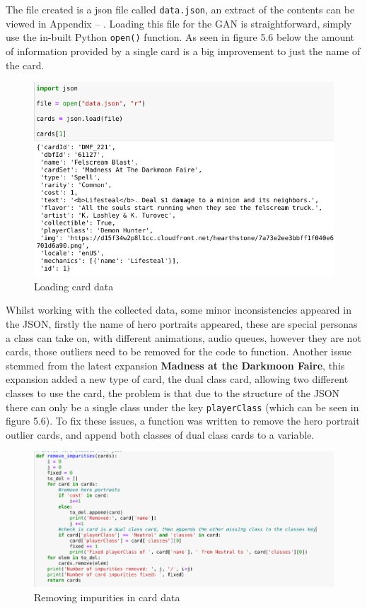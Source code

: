 \documentclass{report} %
\begin{document}
The file created is a json file called \nolinkurl{data.json}, an extract of the contents can be viewed in Appendix -- .  Loading this file for the GAN is straightforward, simply use the in-built Python \nolinkurl{open()} function. As seen in figure 5.6 below the amount of information provided by a single card is a big improvement to just the name of the card.

\begin{figure}[H]
\centering
\includegraphics[width=1\textwidth]{jsonOpen}
\caption{Loading card data\protect}
 \label{board}
\end{figure}

Whilst working with the collected data, some minor inconsistencies appeared in the JSON, firstly the name of hero portraits appeared, these are special personas a class can take on, with different animations, audio queues, however they are not cards, those outliers need to be removed for the code to function. Another issue stemmed from the latest expansion \textbf{Madness at the Darkmoon Faire}, this expansion added a new type of card, the dual class card, allowing two different classes to use the card, the problem is that due to the structure of the JSON there can only be a single class under the key \nolinkurl{playerClass} (which can be seen in figure 5.6). To fix these issues, a function was written to remove the hero portrait outlier cards, and append both classes of dual class cards to a variable. 

\begin{figure}[H]
\centering
\includegraphics[width=1.25\textwidth]{impure}
\caption{Removing impurities in card data\protect}
 \label{board}
\end{figure}
\end{document}
